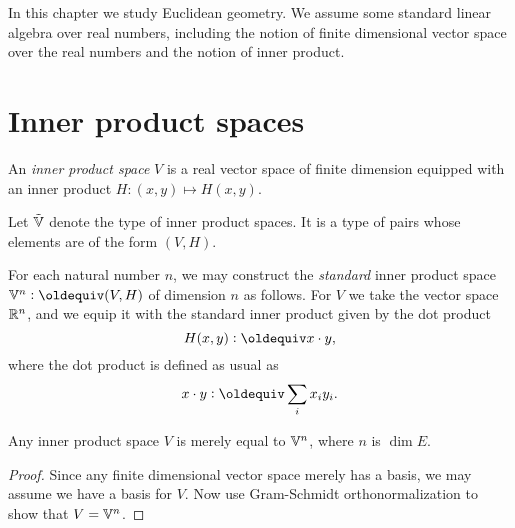 


In this chapter we study Euclidean geometry.  We assume some standard linear
algebra over real numbers, including the notion of finite dimensional vector
space over the real numbers and the notion of inner product.

\section{Inner product spaces}

\begin{definition}\label{def:InnerProductSpace}
  An {\em inner product space} $V$ is a real vector space of finite dimension
  equipped with an inner product $H : (x,y) \mapsto H( x,y )$.
\end{definition}

Let ${\tilde {\mathbb V}}$ denote the type of inner product spaces.  It is a type of pairs whose
elements are of the form $(V,H)$.

For each natural number $n$, we may construct the {\em standard} inner product
space $\VV^n \defeq (V,H)$ of dimension $n$ as follows.  For $V$ we take the
vector space $\mathbb{R}^n$, and we equip it with the standard inner product given by
the dot product
$$ H ( x , y) \defeq x \cdot y, $$
where the dot product is defined as usual as
$$ x \cdot y \defeq \sum_i x_i y_i . $$

\begin{theorem}\label{thm:GramSchmidt}
  Any inner product space $V$ is merely equal to $\mathbb V^n$, where $n$ is $\dim E$.
\end{theorem}

\begin{proof}
  Since any finite dimensional vector space merely has a basis, we may assume
  we have a basis for $V$.  Now use Gram-Schmidt orthonormalization to show
  that $V = \mathbb V^n$.
\end{proof}

